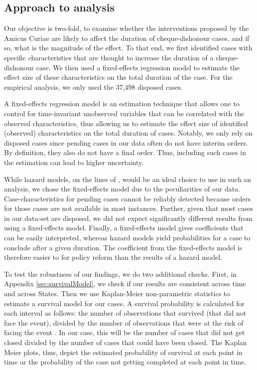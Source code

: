 \documentclass[12pt,a4paper]{article}
\begin{document}
\subsection{Approach to analysis} \label{sec:approach-analysis}

Our objective is two-fold, to examine whether the interventions proposed by the Amicus Curiae are likely to affect the duration of cheque-dishonour cases, and if so, what is the magnitude of the effect. To that end, we first identified cases with specific characteristics that are thought to increase the duration of a cheque-dishonour case. We then used a fixed-effects regression model to estimate the effect size of these characteristics on the total duration of the case. For the empirical analysis, we only used the 37,498 disposed cases.

A fixed-effects regression model is an estimation technique that allows one to control for time-invariant unobserved variables that can be correlated with the observed characteristics, thus allowing us to estimate the effect size of identified (observed) characteristics on the total duration of cases. Notably, we only rely on disposed cases since pending cases in our data often do not have interim orders. By definition, they also do not have a final order. Thus, including such cases in the estimation can lead to higher uncertainty.

While hazard models, on the lines of \textcite{datta2017_itatDelays}, would be an ideal choice to use in such an analysis, we chose the fixed-effects model due to the peculiarities of our data. Case-characteristics for pending cases cannot be reliably detected because orders for those cases are not available in most instances. Further, given that most cases in our data-set are disposed, we did not expect significantly different results from using a fixed-effects model. Finally, a fixed-effects model gives coefficients that can be easily interpreted, whereas hazard models yield probabilities for a case to conclude after a given duration. The coefficient from the fixed-effects model is therefore easier to for policy reform than the results of a hazard model.

To test the robustness of our findings, we do two additional checks. First, in Appendix \ref{sec:survivalModel}, we check if our results are consistent across time and across States. Then we use Kaplan-Meier non-parametric statistics to estimate a survival model for our cases. A survival probability is calculated for each interval as follows: the number of observations that survived (that did not face the event), divided by the number of observations that were at the risk of facing the event \autocite{rich2010practical}. In our case, this will be the number of cases that did not get closed divided by the number of cases that could have been closed. The Kaplan Meier plots, thus, depict the estimated probability of survival at each point in time or the probability of the case not getting completed at each point in time.
\end{document}
